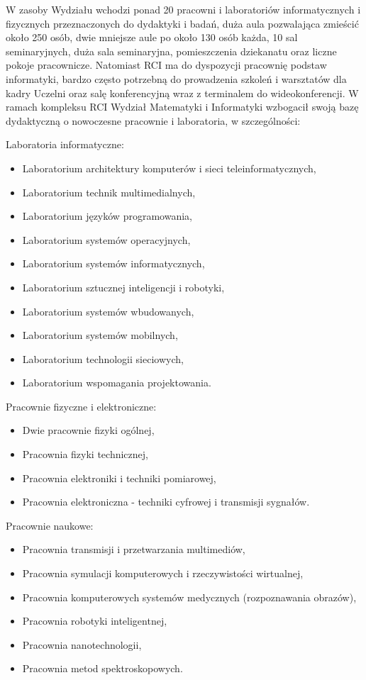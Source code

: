 \documentclass[a4paper,12pt]{article}
\begin{document}
W zasoby Wydziału wchodzi ponad 20 pracowni i laboratoriów informatycznych i fizycznych przeznaczonych
do dydaktyki i badań, duża aula pozwalająca zmieścić około 250 osób, dwie mniejsze aule po około 130 osób
każda, 10 sal seminaryjnych, duża sala seminaryjna, pomieszczenia dziekanatu oraz liczne pokoje pracownicze.
Natomiast RCI ma do dyspozycji pracownię podstaw informatyki, bardzo często potrzebną do prowadzenia
szkoleń i warsztatów dla kadry Uczelni oraz salę konferencyjną wraz z terminalem do wideokonferencji.
W ramach kompleksu RCI Wydział Matematyki i Informatyki wzbogacił swoją bazę dydaktyczną o
nowoczesne pracownie i laboratoria, w szczególności:

Laboratoria informatyczne:

\begin {itemize}
\item Laboratorium architektury komputerów i sieci teleinformatycznych,
\item Laboratorium technik multimedialnych,
\item Laboratorium języków programowania,
\item Laboratorium systemów operacyjnych,
\item Laboratorium systemów informatycznych,
\item Laboratorium sztucznej inteligencji i robotyki,
\item Laboratorium systemów wbudowanych,
\item Laboratorium systemów mobilnych,
\item Laboratorium technologii sieciowych,
\item Laboratorium wspomagania projektowania.
\end {itemize}

Pracownie fizyczne i elektroniczne:

\begin{itemize}
\item Dwie pracownie fizyki ogólnej,
\item Pracownia fizyki technicznej,
\item Pracownia elektroniki i techniki pomiarowej,
\item Pracownia elektroniczna - techniki cyfrowej i transmisji sygnałów.
\end {itemize}
Pracownie naukowe:
\begin{itemize}
\item Pracownia transmisji i przetwarzania multimediów,
\item Pracownia symulacji komputerowych i rzeczywistości wirtualnej,
\item Pracownia komputerowych systemów medycznych (rozpoznawania obrazów),
\item Pracownia robotyki inteligentnej,
\item Pracownia nanotechnologii,
\item Pracownia metod spektroskopowych.
\end {itemize}
\end{document}
